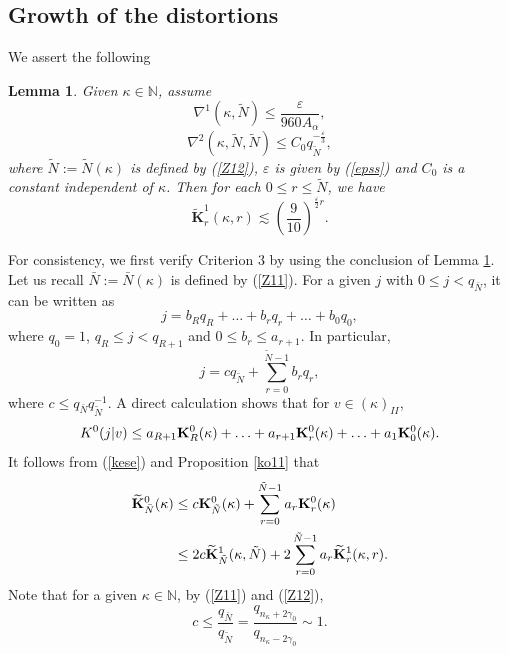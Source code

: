 \documentclass{amsart}
\newtheorem{Lemma}[Definition]{Lemma}
\theoremstyle{definition}
\begin{document}
\subsection{Growth of the distortions}
We assert the following
\begin{Lemma}\label{last}
Given $\kappa\in \mathbb{N}$, assume
\begin{equation}\label{f1x}
\nabla^1(\kappa,\tilde{N})\leq \frac{\varepsilon}{960A_\alpha},
\end{equation}
\begin{equation}\label{f2x}
\nabla^2(\kappa,\tilde{N},\tilde{N})\leq C_0 q_{\tilde{N}}^{-\frac{\varepsilon}{3}},
\end{equation}
where $\tilde{N}:=\tilde{N}(\kappa)$ is defined by (\ref{Z12}), $\varepsilon$ is given by (\ref{epss}) and $C_0$ is a constant independent of $\kappa$. Then for each $0\leq r\leq \tilde{N}$, we have
\begin{equation}\label{kkes}
\widetilde{\mathbf{K}}_{r}^1(\kappa,r)\lesssim (\frac{9}{10})^{\frac{\varepsilon}{2} r}.
\end{equation}
\end{Lemma}
For consistency, we first verify Criterion 3 by using the conclusion of Lemma \ref{last}.
Let us recall $\bar{N}:=\bar{N}(\kappa)$ is defined by (\ref{Z11}). For a given $j$ with $0\leq j<q_{\bar{N}}$, it can be written as
\[j=b_Rq_R+\ldots+b_rq_r+\ldots+b_0q_0,\]
where $q_0=1$, $q_R\leq j<q_{R+1}$ and $0\leq b_r\leq a_{r+1}$. In particular,
\[j=c q_{\tilde{N}}+\sum_{r=0}^{\tilde{N}-1}b_rq_r,\]
where $c\leq q_{\bar{N}}q_{\tilde{N}}^{-1}$. A direct calculation shows that for $v\in (\kappa)_{II}$,
\begin{equation}\label{kese}
K^0(j|v)\leq a_{R+1}\bold{K}_R^0(\kappa)+\ldots+a_{r+1}\bold{K}_{r}^0(\kappa)+\ldots+a_1\bold{K}_0^0(\kappa).
\end{equation}
It follows from (\ref{kese}) and Proposition \ref{ko11} that
\begin{equation}\label{nrev}
	\begin{split}
		\widetilde{\mathbf{K}}^0_{\bar{N}}(\kappa)&\leq c\bold{K}^0_{\tilde{N}}(\kappa)+\sum_{r=0}^{\tilde{N}-1}a_r\bold{K}^0_{r}(\kappa)\\
		&\leq 2c\widetilde{\mathbf{K}}^1_{\tilde{N}}(\kappa,\tilde{N})+2\sum_{r=0}^{\tilde{N}-1}a_r\widetilde{\mathbf{K}}^1_{r}(\kappa,r).
	\end{split}
\end{equation}
Note that for a given $\kappa\in \mathbb{N}$, by (\ref{Z11}) and (\ref{Z12}),
\begin{equation}\label{qratq}
c\leq \frac{q_{\bar{N}}}{q_{\tilde{N}}}=\frac{q_{n_\kappa+2\gamma_0}}{q_{n_\kappa-2\gamma_0}}\sim 1.
\end{equation}
\end{document}
